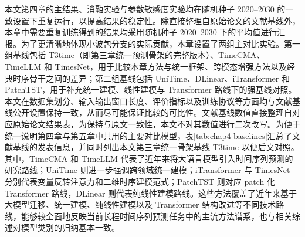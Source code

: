 \begin{table}[!htb]
\begin{tabular}{c|c}
\bottomrule
\end{tabular}
\end{table} 本文第四章的主结果、消融实验与参数敏感度实验均在随机种子 2020--2030 的一致设置下重复运行，以提高结果的稳定性。除直接整理自原始论文的文献基线外，本章中需要重复训练得到的结果均采用随机种子 2020--2030 下的平均值进行汇报。为了更清晰地体现小波包分支的实际贡献，本章设置了两组主对比实验。第一组基线包括 T3time（即第三章统一预测骨架的完整版本）、TimeCMA、TimeLLM 和 TimesNet，用于比较本章方法与统一框架、跨模态增强方法以及经典时序骨干之间的差异；第二组基线包括 UniTime、DLinear、iTransformer 和 PatchTST，用于补充统一建模、线性建模与 Transformer 路线下的强基线对照。本文在数据集划分、输入输出窗口长度、评价指标以及训练协议等方面均与文献基线公开设置保持一致，从而尽可能保证比较的可比性。文献基线数值直接整理自对应原始论文结果表，为保持与原文一致性，本文不对其数值进行二次改写。为便于统一说明第四章与第五章中共用的主要对比模型，表\ref{tab:chap4-baselines}汇总了文献基线的发表信息，并同时列出本文第三章统一骨架基线 T3time 以便后文对照。其中，TimeCMA 和 TimeLLM 代表了近年来将大语言模型引入时间序列预测的研究路线；UniTime 则进一步强调跨领域统一建模；iTransformer 与 TimesNet 分别代表变量反转注意力和二维时序建模范式\cite{liu2024itransformer,wu2023timesnet}；PatchTST 则对应 patch 化 Transformer 路线\cite{nie2023patchtst}，DLinear 则代表纯线性建模路线。这些方法覆盖了近年来基于大模型迁移、统一建模、纯线性建模以及 Transformer 结构改进等不同技术路线，能够较全面地反映当前长程时间序列预测任务中的主流方法谱系，也与相关综述对模型类别的归纳基本一致。 \enlargethispage{3\baselineskip}
